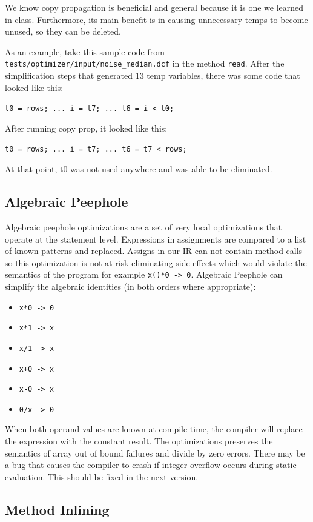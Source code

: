 \documentclass[11pt]{article}
\begin{document}
  We know copy propagation is beneficial and general because it is one we learned in class. Furthermore,
  its main benefit is in causing unnecessary temps to become unused, so they can be deleted.

  As an example, take this sample code from \texttt{tests/optimizer/input/noise\_median.dcf} in the method \texttt{read}. 
  After the simplification steps that generated 13 temp variables, there was some code that looked like
  this:

  \texttt{t0 = rows; ... i = t7; ... t6 = i < t0;}

  After running copy prop, it looked like this:
  
  \texttt{t0 = rows; ... i = t7; ... t6 = t7 < rows;}

  At that point, t0 was not used anywhere and was able to be eliminated.

\subsection{Algebraic Peephole}
\label{sec-2.6}


  Algebraic peephole optimizations are a set of very local optimizations that operate at the statement level.
  Expressions in assignments are compared to a list of known patterns and replaced.
  Assigns in our IR can not contain method calls so this optimization is not at risk eliminating side-effects
  which would violate the semantics of the program for example \texttt{x()*0 -> 0}.
  Algebraic Peephole can simplify the algebraic identities (in both orders where appropriate):
\begin{itemize}
\item \texttt{x*0 -> 0}
\item \texttt{x*1 -> x}
\item \texttt{x/1 -> x}
\item \texttt{x+0 -> x}
\item \texttt{x-0 -> x}
\item \texttt{0/x -> 0}
\end{itemize}
  
  When both operand values are known at compile time, the compiler will replace the expression with the constant result.
  The optimizations preserves the semantics of array out of bound failures and divide by zero errors.
  There may be a bug that causes the compiler to crash if integer overflow occurs during static evaluation. This should be fixed in the next version.


\subsection{Method Inlining}
\label{sec-2.7}
\end{document}
